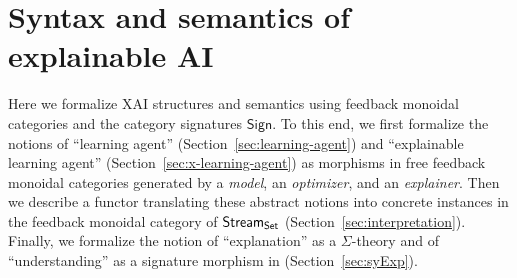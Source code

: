 \section{Syntax and semantics of explainable AI}
\label{sec:framework}
Here we formalize XAI structures and semantics using feedback monoidal categories and the category signatures $\mathsf{Sign}$. 
To this end, we first formalize the notions of ``learning agent'' (Section~\ref{sec:learning-agent}) and ``explainable learning agent'' (Section~\ref{sec:x-learning-agent}) as morphisms in free feedback monoidal categories generated by a \emph{model}, an \emph{optimizer}, and an \emph{explainer}.  Then we describe a functor translating these abstract notions into concrete instances in the feedback monoidal category of \(\mathsf{Stream}_{\mathsf{Set}}\) (Section~\ref{sec:interpretation}). 
Finally, we formalize the notion of ``explanation'' as a $\Sigma$-theory and of ``understanding'' as a signature morphism in (Section~\ref{sec:syExp}).




